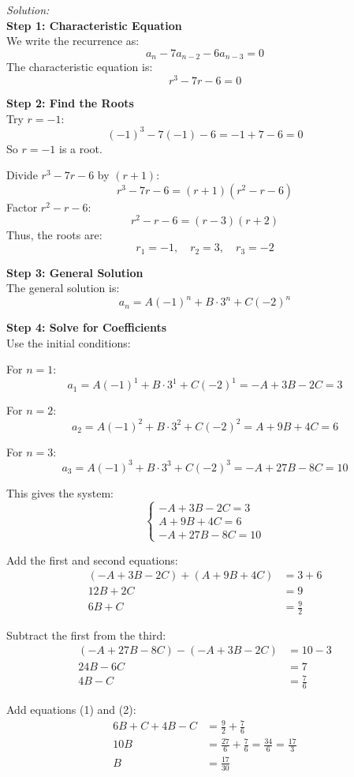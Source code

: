 \documentclass[11pt,letterpaper]{article}
\newenvironment{solution}                      
        {\begin{mdframed}\textit{Solution:} \\}
        {\end{mdframed}}
\begin{document}
\begin{solution}
\textbf{Step 1: Characteristic Equation}\\
We write the recurrence as:
\[
a_n - 7a_{n-2} - 6a_{n-3} = 0
\]
The characteristic equation is:
\[
r^3 - 7r - 6 = 0
\]

\noindent\textbf{Step 2: Find the Roots}\\
Try $r = -1$:
\[
(-1)^3 - 7(-1) - 6 = -1 + 7 - 6 = 0
\]
So $r = -1$ is a root.

Divide $r^3 - 7r - 6$ by $(r + 1)$:
\[
r^3 - 7r - 6 = (r + 1)(r^2 - r - 6)
\]
Factor $r^2 - r - 6$:
\[
r^2 - r - 6 = (r - 3)(r + 2)
\]
Thus, the roots are:
\[
r_1 = -1, \quad r_2 = 3, \quad r_3 = -2
\]

\noindent\textbf{Step 3: General Solution}\\
The general solution is:
\[
a_n = A(-1)^n + B \cdot 3^n + C(-2)^n
\]

\noindent\textbf{Step 4: Solve for Coefficients}\\
Use the initial conditions:

For $n=1$:
\[
a_1 = A(-1)^1 + B \cdot 3^1 + C(-2)^1 = -A + 3B - 2C = 3
\]

For $n=2$:
\[
a_2 = A(-1)^2 + B \cdot 3^2 + C(-2)^2 = A + 9B + 4C = 6
\]

For $n=3$:
\[
a_3 = A(-1)^3 + B \cdot 3^3 + C(-2)^3 = -A + 27B - 8C = 10
\]

This gives the system:
\[
\begin{cases}
-A + 3B - 2C = 3 \\
A + 9B + 4C = 6 \\
-A + 27B - 8C = 10
\end{cases}
\]

Add the first and second equations:
\begin{align*}
(-A + 3B - 2C) + (A + 9B + 4C) &= 3 + 6 \\
12B + 2C &= 9 \\
6B + C &= \frac{9}{2} \tag{1}
\end{align*}

Subtract the first from the third:
\begin{align*}
(-A + 27B - 8C) - (-A + 3B - 2C) &= 10 - 3 \\
24B - 6C &= 7 \\
4B - C &= \frac{7}{6} \tag{2}
\end{align*}

Add equations (1) and (2):
\begin{align*}
6B + C + 4B - C &= \frac{9}{2} + \frac{7}{6} \\
10B &= \frac{27}{6} + \frac{7}{6} = \frac{34}{6} = \frac{17}{3} \\
B &= \frac{17}{30}
\end{align*}


\end{solution}
\end{document}

